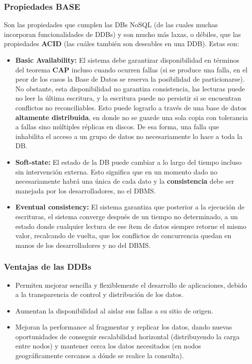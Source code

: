 \subsubsection*{Propiedades BASE}
Son las propiedades que cumplen las DBs NoSQL (de las cuales muchas incorporan funcionalidades de DDBs) y son mucho más laxas, o débiles, que las propiedades \textbf{ACID} (las cuáles también son deseables en una DDB). Estas son:
\begin{itemize}
    \item \textbf{Basic Availability:} El sistema debe garantizar disponibilidad en términos del teorema \textbf{CAP} incluso cuando ocurren fallas (si se produce una falla, en el peor de los casos la Base de Datos se reserva la posibilidad de particionarse). No obstante, esta disponibilidad no garantiza consistencia, las lecturas puede no leer la última escritura, y la escritura puede no persistir si se encuentran conflictos no reconciliables. Esto puede lograrlo a través de una base de datos \textbf{altamente distribuida}, en donde no se guarde una sola copia con tolerancia a fallas sino múltiples réplicas en discos. De esa forma, una falla que inhabilita el acceso a un grupo de datos no necesariamente lo hace a toda la DB. 
    \item \textbf{Soft-state:} El estado de la DB puede cambiar a lo largo del tiempo incluso sin intervención externa. Esto significa que en un momento dado no necesariamente habrá una única  de cada dato y la \textbf{consistencia} debe ser manejada por los desarrolladores, no el DBMS.
    \item \textbf{Eventual consistency:} El sistema garantiza que posterior a la ejecución de escrituras, el sistema converge después de un tiempo no determinado, a un estado donde cualquier lectura de ese ítem de datos siempre retorne el mismo valor, recalcando de vuelta, que los conflictos de concurrencia quedan en manos de los desarrolladores y no del DBMS.
\end{itemize}


\subsubsection*{Ventajas de las DDBs}
\begin{itemize}
    \item Permiten mejorar sencilla y flexiblemente el desarrollo de aplicaciones, debido a la transparencia de control y distribución de los datos.
    \item Aumentan la disponibilidad al aislar sus fallas a su sitio de origen.
    \item Mejoran la performance al fragmentar y replicar los datos, dando nuevas oportunidades de conseguir escalabilidad horizontal (distribuyendo la carga entre nodos) y mantener cerca los datos necesitados (en nodos geográficamente cercanos a dónde se realice la consulta).
\end{itemize}

